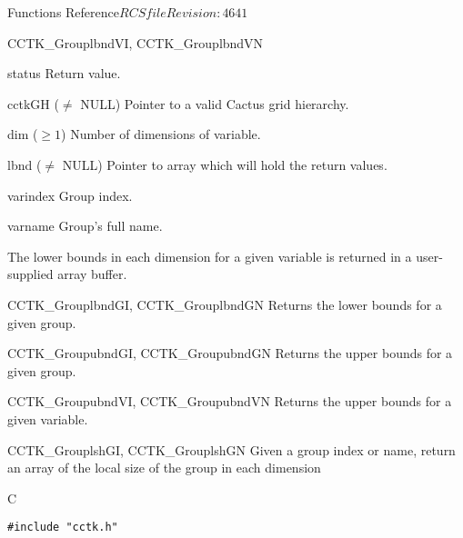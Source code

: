 \begin{cactuspart}{ Functions Reference}{$RCSfile$}{$Revision: 4641 $}
\begin{FunctionDescription}{CCTK\_GrouplbndVI, CCTK\_GrouplbndVN}
\begin{ParameterSection}
\begin{Parameter}{status} Return value. \end{Parameter}
\begin{Parameter}{cctkGH ($\ne$ NULL)} Pointer to a valid Cactus grid hierarchy. \end{Parameter}
\begin{Parameter}{dim ($\ge 1$)} Number of dimensions of variable. \end{Parameter}
\begin{Parameter}{lbnd ($\ne$ NULL)} Pointer to array which will hold the return values. \end{Parameter}
\begin{Parameter}{varindex} Group index. \end{Parameter}
\begin{Parameter}{varname} Group's full name. \end{Parameter}
\end{ParameterSection}

\begin{Discussion}
The lower bounds in each dimension for a given variable is returned in a user-supplied array buffer.
\end{Discussion}

\begin{SeeAlsoSection}
\begin{SeeAlso}{CCTK\_GrouplbndGI, CCTK\_GrouplbndGN}
Returns the lower bounds for a given group.
\end{SeeAlso}
\begin{SeeAlso}{CCTK\_GroupubndGI, CCTK\_GroupubndGN}
Returns the upper bounds for a given group.
\end{SeeAlso}
\begin{SeeAlso}{CCTK\_GroupubndVI, CCTK\_GroupubndVN}
Returns the upper bounds for a given variable.
\end{SeeAlso}
\end{SeeAlsoSection}
\end{FunctionDescription}


\begin{FunctionDescription}{CCTK\_GrouplshGI, CCTK\_GrouplshGN}
\label{CCTK-GrouplshGI}
\label{CCTK-GrouplshGN}
Given a group index or name, return an array of the local size of the group in each dimension

\begin{SynopsisSection}
\begin{Synopsis}{C}
\begin{verbatim}
#include "cctk.h"


\end{verbatim}
\end{Synopsis}
\end{SynopsisSection}
\end{FunctionDescription}
\end{cactuspart}
